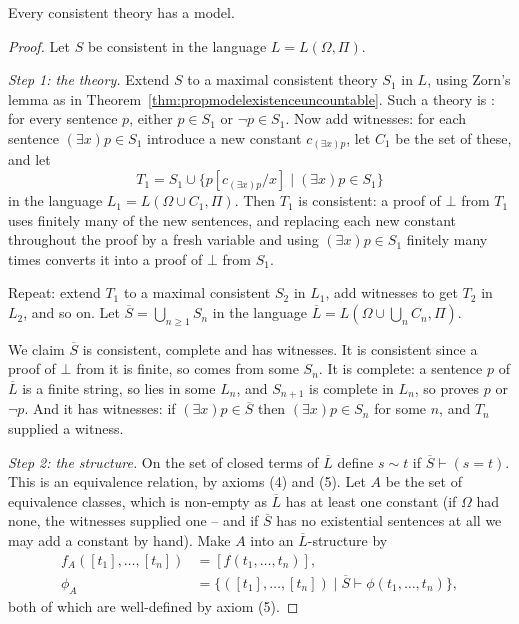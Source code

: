 \documentclass[a4paper]{scrartcl}
\begin{document}
\begin{theorem}\label{thm:predmodelexistence}
  Every consistent theory has a model.
\end{theorem}
\begin{proof}
  Let $S$ be consistent in the language $L = L(\Omega, \Pi)$.

  \emph{Step 1: the theory.} Extend $S$ to a maximal consistent theory $S_1$ in $L$, using Zorn's lemma as in Theorem~\ref{thm:propmodelexistenceuncountable}. Such a theory is : for every sentence $p$, either $p \in S_1$ or $\lnot p \in S_1$. Now add witnesses: for each sentence $(\exists x) p \in S_1$ introduce a new constant $c_{(\exists x)p}$, let $C_1$ be the set of these, and let
  $$T_1 = S_1 \cup \{p[c_{(\exists x)p}/x] \mid (\exists x)p \in S_1\}$$
  in the language $L_1 = L(\Omega \cup C_1, \Pi)$. Then $T_1$ is consistent: a proof of $\bot$ from $T_1$ uses finitely many of the new sentences, and replacing each new constant throughout the proof by a fresh variable and using $(\exists x)p \in S_1$ finitely many times converts it into a proof of $\bot$ from $S_1$.

  Repeat: extend $T_1$ to a maximal consistent $S_2$ in $L_1$, add witnesses to get $T_2$ in $L_2$, and so on. Let $\overline{S} = \bigcup_{n \geq 1} S_n$ in the language $\overline{L} = L(\Omega \cup \bigcup_n C_n, \Pi)$.

  We claim $\overline S$ is consistent, complete and has witnesses. It is consistent since a proof of $\bot$ from it is finite, so comes from some $S_n$. It is complete: a sentence $p$ of $\overline L$ is a finite string, so lies in some $L_n$, and $S_{n+1}$ is complete in $L_n$, so proves $p$ or $\lnot p$. And it has witnesses: if $(\exists x) p \in \overline S$ then $(\exists x)p \in S_n$ for some $n$, and $T_n$ supplied a witness.

  \emph{Step 2: the structure.} On the set of closed terms of $\overline L$ define $s \sim t$ if $\overline S \vdash (s = t)$. This is an equivalence relation, by axioms (4) and (5). Let $A$ be the set of equivalence classes, which is non-empty as $\overline L$ has at least one constant (if $\Omega$ had none, the witnesses supplied one -- and if $\overline S$ has no existential sentences at all we may add a constant by hand). Make $A$ into an $\overline L$-structure by
  \begin{align*}
    f_A([t_1], \dots, [t_n]) &= [f(t_1, \dots, t_n)], \\
    \phi_A &= \{([t_1], \dots, [t_n]) \mid \overline S \vdash \phi(t_1, \dots, t_n)\},
  \end{align*}
  both of which are well-defined by axiom (5).


\end{proof}
\end{document}
